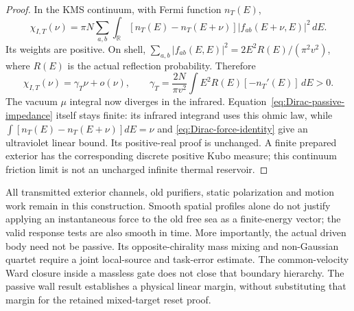 \documentclass[12pt,a4paper]{article}
\begin{document}
\begin{proof}
In the KMS continuum, with Fermi function $n_T(E)$,
\begin{equation}
 \chi_{I,T}(\nu)=\pi N\sum_{a,b}\int_{\mathbb R}
 [n_T(E)-n_T(E+\nu)]|f_{ab}(E+\nu,E)|^2\,dE.             \label{eq:Dirac-KMS-force}
\end{equation}
Its weights are positive. On shell,
$\sum_{a,b}|f_{ab}(E,E)|^2=2E^2R(E)/(\pi^2v^2)$,
where $R(E)$ is the actual reflection probability. Therefore
\begin{equation}
 \chi_{I,T}(\nu)=\gamma_T\nu+o(\nu),\qquad
 \gamma_T=\frac{2N}{\pi v^2}\int E^2R(E)[-n_T'(E)]\,dE>0.
                                                               \label{eq:Dirac-thermal-friction}
\end{equation}
The vacuum $\mu$ integral now diverges in the infrared.
Equation~\eqref{eq:Dirac-passive-impedance} itself stays finite:
its infrared integrand uses this ohmic law, while
$\int[n_T(E)-n_T(E+\nu)]dE=\nu$ and
\eqref{eq:Dirac-force-identity} give an ultraviolet linear bound.
Its positive-real proof is unchanged. A finite prepared exterior has
the corresponding discrete positive Kubo measure; this continuum
friction limit is not an uncharged infinite thermal reservoir.
\end{proof}

All transmitted exterior channels, old purifiers, static polarization
and motion work remain in this construction. Smooth spatial profiles
alone do not justify applying an instantaneous force to the old free
sea as a finite-energy vector; the valid response tests are also smooth
in time. More importantly, the actual driven body need not be passive.
Its opposite-chirality mass mixing and non-Gaussian quartet require a
joint local-source and task-error estimate. The common-velocity Ward
closure inside a massless gate does not close that boundary hierarchy.
The passive wall result establishes a physical linear margin, without
substituting that margin for the retained mixed-target reset proof.
\end{document}
